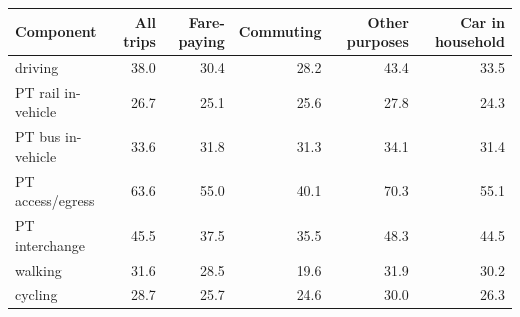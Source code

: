 \begin{tabular}{lrrrrr}
\toprule
Component & All trips & Fare-paying & Commuting & Other purposes & Car in household \\
\midrule
driving & 38.0 & 30.4 & 28.2 & 43.4 & 33.5 \\
PT rail in-vehicle & 26.7 & 25.1 & 25.6 & 27.8 & 24.3 \\
PT bus in-vehicle & 33.6 & 31.8 & 31.3 & 34.1 & 31.4 \\
PT access/egress & 63.6 & 55.0 & 40.1 & 70.3 & 55.1 \\
PT interchange & 45.5 & 37.5 & 35.5 & 48.3 & 44.5 \\
walking & 31.6 & 28.5 & 19.6 & 31.9 & 30.2 \\
cycling & 28.7 & 25.7 & 24.6 & 30.0 & 26.3 \\
\bottomrule
\end{tabular}
